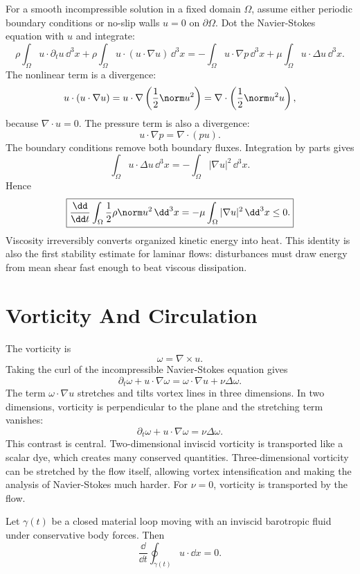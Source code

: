 For a smooth incompressible solution in a fixed domain \(\Omega\), assume either
periodic boundary conditions or no-slip walls \(u=0\) on \(\partial\Omega\).
Dot the Navier-Stokes equation with \(u\) and integrate:
\[
  \rho\int_\Omega u\cdot\partial_tu\,\dd^3x
  +
  \rho\int_\Omega u\cdot(u\cdot\nabla u)\,\dd^3x
  =
  -\int_\Omega u\cdot\nabla p\,\dd^3x
  +
  \mu\int_\Omega u\cdot\Delta u\,\dd^3x.
\]
The nonlinear term is a divergence:
\[
  u\cdot(u\cdot\nabla u)=u\cdot\nabla\left(\frac12\norm u^2\right)
  =
  \nabla\cdot\left(\frac12\norm u^2u\right),
\]
because \(\nabla\cdot u=0\). The pressure term is also a divergence:
\[
  u\cdot\nabla p=\nabla\cdot(pu).
\]
The boundary conditions remove both boundary fluxes. Integration by parts gives
\[
  \int_\Omega u\cdot\Delta u\,\dd^3x
  =
  -\int_\Omega |\nabla u|^2\,\dd^3x.
\]
Hence
\[
  \boxed{
  \frac{\dd}{\dd t}
  \int_\Omega \frac12\rho\norm u^2\,\dd^3x
  =
  -\mu\int_\Omega |\nabla u|^2\,\dd^3x\leq0.
  }
\]
Viscosity irreversibly converts organized kinetic energy into heat. This
identity is also the first stability estimate for laminar flows: disturbances
must draw energy from mean shear fast enough to beat viscous dissipation.

\section{Vorticity And Circulation}
\label{sec:vorticity-circulation}

The vorticity is
\[
  \omega=\nabla\times u.
\]
Taking the curl of the incompressible Navier-Stokes equation gives
\[
  \boxed{
  \partial_t\omega+u\cdot\nabla\omega
  =
  \omega\cdot\nabla u+\nu\Delta\omega.
  }
\]
The term \(\omega\cdot\nabla u\) stretches and tilts vortex lines in three
dimensions. In two dimensions, vorticity is perpendicular to the plane and the
stretching term vanishes:
\[
  \partial_t\omega+u\cdot\nabla\omega=\nu\Delta\omega.
\]
This contrast is central. Two-dimensional inviscid vorticity is transported
like a scalar dye, which creates many conserved quantities. Three-dimensional
vorticity can be stretched by the flow itself, allowing vortex intensification
and making the analysis of Navier-Stokes much harder.
For \(\nu=0\), vorticity is transported by the flow.

\begin{proposition}
Let \(\gamma(t)\) be a closed material loop moving with an inviscid barotropic
fluid under conservative body forces. Then
\[
  \frac{\dd}{\dd t}\oint_{\gamma(t)}u\cdot \dd x=0.
\]
\end{proposition}

